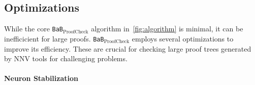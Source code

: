 \documentclass[oneside,11pt,dvipsnames]{book}
\numberwithin{equation}{section}
\theoremstyle{definition}
\theoremstyle{remark}
\newcommand{\prooflang}{\texttt{BaB$_{\text{ProofLang}}$}}
\newcommand{\proofcheck}{\texttt{BaB$_{\text{ProofCheck}}$}}
\begin{document}

\subsection{Optimizations}
While the core \proofcheck{} algorithm in~\autoref{fig:algorithm} is minimal, it can be inefficicient for large proofs.
\proofcheck{} employs several optimizations to improve its efficiency. These are crucial for checking large proof trees generated by NNV tools for challenging problems.

\paragraph{Neuron Stabilization}





\end{document}
